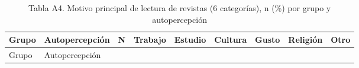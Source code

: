 \documentclass[
  spanish,
  12pt,
]{extarticle}
\begin{document}
\begin{longtable}[]{@{}
  >{\raggedright\arraybackslash}p{}
  >{\raggedright\arraybackslash}p{}
  >{\raggedleft\arraybackslash}p{}
  >{\raggedright\arraybackslash}p{}
  >{\raggedright\arraybackslash}p{}
  >{\raggedright\arraybackslash}p{}
  >{\raggedright\arraybackslash}p{}
  >{\raggedright\arraybackslash}p{}
  >{\raggedright\arraybackslash}p{}@{}}
\caption{Tabla A4. Motivo principal de lectura de revistas (6
categorías), n (\%) por grupo y autopercepción}\tabularnewline
\toprule\noalign{}
\begin{minipage}[b]{\linewidth}\raggedright
Grupo
\end{minipage} & \begin{minipage}[b]{\linewidth}\raggedright
Autopercepción
\end{minipage} & \begin{minipage}[b]{\linewidth}\raggedleft
N
\end{minipage} & \begin{minipage}[b]{\linewidth}\raggedright
Trabajo
\end{minipage} & \begin{minipage}[b]{\linewidth}\raggedright
Estudio
\end{minipage} & \begin{minipage}[b]{\linewidth}\raggedright
Cultura
\end{minipage} & \begin{minipage}[b]{\linewidth}\raggedright
Gusto
\end{minipage} & \begin{minipage}[b]{\linewidth}\raggedright
Religión
\end{minipage} & \begin{minipage}[b]{\linewidth}\raggedright
Otro
\end{minipage} \\
\midrule\noalign{}
\endfirsthead
\toprule\noalign{}
\begin{minipage}[b]{\linewidth}\raggedright
Grupo
\end{minipage} & \begin{minipage}[b]{\linewidth}\raggedright
Autopercepción
\end{minipage} & \begin{minipage}[b]{\linewidth}\raggedleft

\end{minipage}
\end{longtable}
\end{document}
